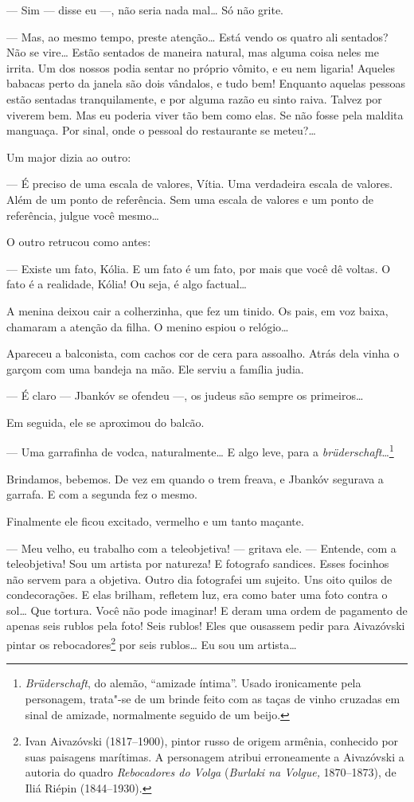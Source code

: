 --- Sim --- disse eu ---, não seria nada mal\ldots{} Só
não grite.

--- Mas, ao mesmo tempo, preste atenção\ldots{} Está vendo os quatro
ali sentados? Não se vire\ldots{} Estão sentados de maneira natural, mas
alguma coisa neles me irrita. Um dos nossos podia sentar no próprio
vômito, e eu nem ligaria! Aqueles babacas perto da janela são dois
vândalos, e tudo bem! Enquanto aquelas pessoas estão sentadas
tranquilamente, e por alguma razão eu sinto raiva. Talvez por viverem
bem. Mas eu poderia viver tão bem como elas. Se não fosse pela maldita
manguaça. Por sinal, onde o pessoal do restaurante se meteu?\ldots{}

Um major dizia ao outro:

--- É preciso de uma escala de valores, Vítia. Uma verdadeira
escala de valores. Além de um ponto de referência. Sem uma escala de
valores e um ponto de referência, julgue você mesmo\ldots{}

O outro retrucou como antes:

--- Existe um fato, Kólia. E um fato é um fato, por mais que você
dê voltas. O fato é a realidade, Kólia! Ou seja, é algo factual\ldots{}

A menina deixou cair a colherzinha, que fez um tinido. Os pais, em voz
baixa, chamaram a atenção da filha. O menino espiou o relógio\ldots{}

Apareceu a balconista, com cachos cor de cera para assoalho. Atrás dela
vinha o garçom com uma bandeja na mão. Ele serviu a família judia.

--- É claro --- Jbankóv se ofendeu ---, os judeus
são sempre os primeiros\ldots{}

Em seguida, ele se aproximou do balcão.

--- Uma garrafinha de vodca, naturalmente\ldots{} E algo leve, para a
\emph{brüderschaft}\ldots{}\footnote{\emph{Brüderschaft}, do alemão,
  ``amizade íntima''. Usado ironicamente pela personagem, trata"-se de um
  brinde feito com as taças de vinho cruzadas em sinal de amizade,
  normalmente seguido de um beijo.}

Brindamos, bebemos. De vez em quando o trem freava, e Jbankóv segurava a
garrafa. E com a segunda fez o mesmo.

Finalmente ele ficou excitado, vermelho e um tanto maçante.

--- Meu velho, eu trabalho com a teleobjetiva! --- gritava
ele. --- Entende, com a teleobjetiva! Sou um artista por
natureza! E fotografo sandices. Esses focinhos não servem para a
objetiva. Outro dia fotografei um sujeito. Uns oito quilos de
condecorações. E elas brilham, refletem luz, era como bater uma foto
contra o sol\ldots{} Que tortura. Você não pode imaginar! E deram uma ordem
de pagamento de apenas seis rublos pela foto! Seis rublos! Eles que
ousassem pedir para Aivazóvski pintar os rebocadores\footnote{Ivan
  Aivazóvski (1817--1900), pintor russo de origem armênia, conhecido por
  suas paisagens marítimas. A personagem atribui erroneamente a
  Aivazóvski a autoria do quadro \emph{Rebocadores do Volga}
  (\emph{Burlaki na Volgue,} 1870--1873), de Iliá Riépin (1844--1930).}
por seis rublos\ldots{} Eu sou um artista\ldots{}

